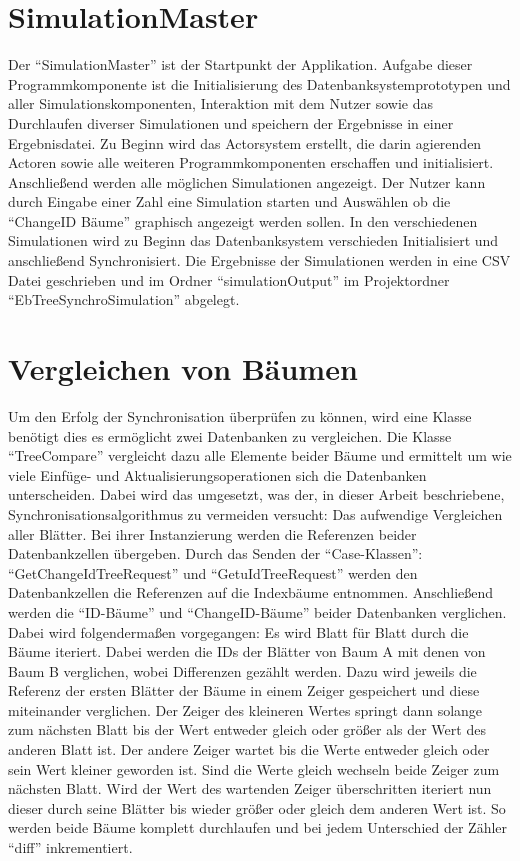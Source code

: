 \documentclass[a4paper,11pt,oneside,%
headsepline,												%
footsepline,												%
bibtotocnumbered									%
]{scrreprt}
\begin{document}
\section{SimulationMaster}
Der \enquote{SimulationMaster} ist der Startpunkt der Applikation. Aufgabe dieser Programmkomponente ist die Initialisierung des Datenbanksystemprototypen und aller Simulationskomponenten, Interaktion mit dem Nutzer sowie das Durchlaufen diverser Simulationen und speichern der Ergebnisse in einer Ergebnisdatei. Zu Beginn wird das Actorsystem erstellt, die darin agierenden Actoren sowie alle weiteren Programmkomponenten erschaffen und initialisiert. Anschließend werden alle möglichen Simulationen angezeigt. Der Nutzer kann durch Eingabe einer Zahl eine Simulation starten und Auswählen ob die \enquote{ChangeID Bäume} graphisch angezeigt werden sollen.
In den verschiedenen Simulationen wird zu Beginn das Datenbanksystem verschieden Initialisiert und anschließend Synchronisiert. Die Ergebnisse der Simulationen werden in eine CSV Datei geschrieben und im Ordner \enquote{simulationOutput} im Projektordner \enquote{EbTreeSynchroSimulation} abgelegt.


\section{Vergleichen von Bäumen}
\label{sec:DiffTrees}
Um den Erfolg der Synchronisation überprüfen zu können, wird eine Klasse benötigt dies es ermöglicht zwei Datenbanken zu vergleichen. Die Klasse \enquote{TreeCompare} vergleicht dazu alle Elemente beider Bäume und ermittelt um wie viele Einfüge- und Aktualisierungsoperationen sich die Datenbanken unterscheiden. Dabei wird das umgesetzt, was der, in dieser Arbeit beschriebene, Synchronisationsalgorithmus zu vermeiden versucht: Das aufwendige Vergleichen aller Blätter. Bei ihrer Instanzierung werden die Referenzen beider Datenbankzellen übergeben. Durch das Senden der \enquote{Case-Klassen}: \enquote{GetChangeIdTreeRequest} und \enquote{GetuIdTreeRequest} werden den Datenbankzellen die Referenzen auf die Indexbäume entnommen. Anschließend werden die  \enquote{ID-Bäume} und \enquote{ChangeID-Bäume} beider Datenbanken verglichen. Dabei wird folgendermaßen vorgegangen: Es wird Blatt für Blatt durch die Bäume iteriert. Dabei werden die IDs der Blätter von Baum A mit denen von Baum B verglichen, wobei Differenzen gezählt werden. Dazu wird jeweils die Referenz der ersten Blätter der Bäume in einem Zeiger gespeichert und diese miteinander verglichen. Der Zeiger des kleineren Wertes springt dann solange zum nächsten Blatt bis der Wert entweder gleich oder größer als der Wert des anderen Blatt ist. Der andere Zeiger wartet bis die Werte entweder gleich oder sein Wert kleiner geworden ist. Sind die Werte gleich wechseln beide Zeiger zum nächsten Blatt. Wird der Wert des wartenden Zeiger überschritten iteriert nun dieser durch seine Blätter bis wieder größer oder gleich dem anderen Wert ist. So werden beide Bäume komplett durchlaufen und bei jedem Unterschied der Zähler \enquote{diff} inkrementiert. 
\end{document}
